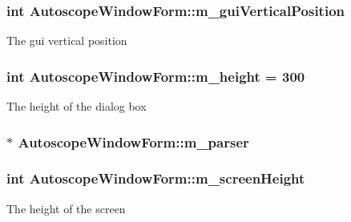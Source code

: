 \subsubsection[{\texorpdfstring{m\+\_\+gui\+Vertical\+Position}{m_guiVerticalPosition}}]{\setlength{\rightskip}{0pt plus 5cm}int Autoscope\+Window\+Form\+::m\+\_\+gui\+Vertical\+Position\hspace{0.3cm}{\ttfamily [private]}}\hypertarget{class_autoscope_window_form_abfd03b3848ab390f59cfe1778595bcb8}{}\label{class_autoscope_window_form_abfd03b3848ab390f59cfe1778595bcb8}
The gui vertical position 
\subsubsection[{\texorpdfstring{m\+\_\+height}{m_height}}]{\setlength{\rightskip}{0pt plus 5cm}int Autoscope\+Window\+Form\+::m\+\_\+height = 300\hspace{0.3cm}{\ttfamily [private]}}\hypertarget{class_autoscope_window_form_a6dbb17c9dce12f2a8775e1510b0139e9}{}\label{class_autoscope_window_form_a6dbb17c9dce12f2a8775e1510b0139e9}
The height of the dialog box 
\subsubsection[{\texorpdfstring{m\+\_\+parser}{m_parser}}]{$\ast$ Autoscope\+Window\+Form\+::m\+\_\+parser\hspace{0.3cm}{\ttfamily [private]}}\hypertarget{class_autoscope_window_form_a2877cb19ca1705acd6860f3edf70cfe2}{}\label{class_autoscope_window_form_a2877cb19ca1705acd6860f3edf70cfe2}
\subsubsection[{\texorpdfstring{m\+\_\+screen\+Height}{m_screenHeight}}]{\setlength{\rightskip}{0pt plus 5cm}int Autoscope\+Window\+Form\+::m\+\_\+screen\+Height\hspace{0.3cm}{\ttfamily [private]}}\hypertarget{class_autoscope_window_form_a60c88c0b6f8f7f5eac46680a7b00b59e}{}\label{class_autoscope_window_form_a60c88c0b6f8f7f5eac46680a7b00b59e}
The height of the screen 
